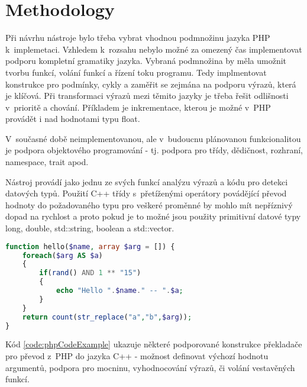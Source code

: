 \documentclass[czech]{ExcelAtFIT}
\begin{document}
\section{Methodology}

	Při návrhu nástroje bylo třeba vybrat vhodnou podmnožinu jazyka PHP k~implemetaci. Vzhledem k~rozsahu nebylo možné za omezený čas implementovat podporu kompletní gramatiky jazyka. Vybraná podmnožina by měla umožnit tvorbu funkcí, volání funkcí a řízení toku programu. Tedy implmentovat konstrukce pro podmínky, cykly a zaměřit se zejmána na podporu výrazů, která je klíčová. Při transformaci výrazů mezi těmito jazyky je třeba řešit odlišnosti v~prioritě a chování. Příkladem je inkrementace, kterou je možné v~PHP provádět i nad hodnotami typu float.

	V~současné době neimplementovanou, ale v~budoucnu plánovanou funkcionalitou je podpora objektového programování - tj. podpora pro třídy, dědičnost, rozhraní, namespace, trait apod.

	Nástroj provádí jako jednu ze svých funkcí analýzu výrazů a kódu pro detekci datových typů. Použití C++ třídy s~přetíženými operátory povádějící převod hodnoty do požadovaného typu pro veškeré proměnné by mohlo mít nepříznivý dopad na rychlost a proto pokud je to možné jsou použity primitivní datové typy long, double, std::string, boolean a std::vector.

\begin{lstlisting}[caption=Podporované výrazy PHP, label=code:phpCodeExample, language=PHP]
function hello($name, array $arg = []) {
	foreach($arg AS $a)
	{
		if(rand() AND 1 ** "15")
		{
			echo "Hello ".$name." -- ".$a;
		}
	}
	return count(str_replace("a","b",$arg));
}
\end{lstlisting}

	Kód \ref{code:phpCodeExample} ukazuje některé podporované konstrukce překladače pro převod z~PHP do jazyka C++ - možnost definovat výchozí hodnotu argumentů, podpora pro mocninu, vyhodnocování výrazů, či volání vestavěných funkcí.



\end{document}
